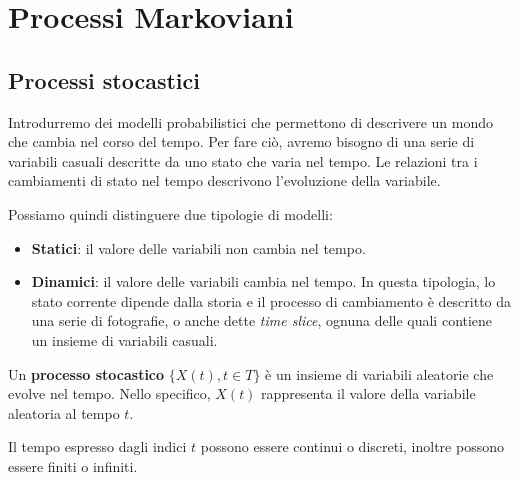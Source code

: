 \chapter{Processi Markoviani}
\section{Processi stocastici}
Introdurremo dei modelli probabilistici che permettono di descrivere un mondo
che cambia nel corso del tempo. Per fare ciò, avremo bisogno di una serie di
variabili casuali descritte da uno stato che varia nel tempo. Le relazioni tra i
cambiamenti di stato nel tempo descrivono l'evoluzione della variabile.

Possiamo quindi distinguere due tipologie di modelli:
\begin{itemize}
    \item \textbf{Statici}: il valore delle variabili non cambia nel tempo.
    \item \textbf{Dinamici}: il valore delle variabili cambia nel tempo. In questa
          tipologia, lo stato corrente dipende dalla storia e il processo di
          cambiamento è descritto da una serie di fotografie, o anche dette
          \textit{time slice}, ognuna delle quali contiene un insieme di variabili
          casuali.
\end{itemize}
\begin{definizione}
    Un \textbf{processo stocastico} $\{X(t), t\in T\}$ è un insieme di variabili
    aleatorie che evolve nel tempo. Nello specifico, $X(t)$ rappresenta il valore
    della variabile aleatoria al tempo $t$.
\end{definizione}
Il tempo espresso dagli indici $t$ possono essere continui o discreti, inoltre
possono essere finiti o infiniti.

